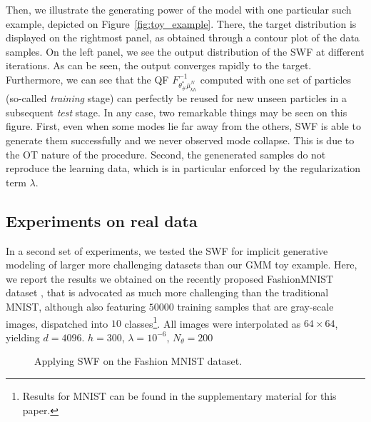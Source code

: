 Then, we illustrate the generating power of the model with one particular such example, depicted on Figure~\ref{fig:toy_example}. There, the target distribution is displayed on the rightmost panel, as obtained through a contour plot of the data samples. On the left panel, we see the output distribution of the SWF at different iterations. As can be seen, the output converges rapidly to the target. Furthermore, we can see that the QF $F^{-1}_{\theta^*_\#\bar{\mu}_{kh}^{N}}$ computed with one set of particles (so-called \textit{training} stage) can perfectly be reused for new unseen particles in a subsequent \textit{test} stage. In any case, two remarkable things may be seen on this figure. First, even when some modes lie far away from the others, SWF is able to generate them successfully and we never observed mode collapse. This is due to the OT nature of the procedure. Second, the genenerated samples do not reproduce the learning data, which is in particular enforced by the regularization term $\lambda$.




\subsection{Experiments on real data}
\label{sub:real_data}

In a second set of experiments, we tested the SWF for implicit generative modeling of larger more challenging datasets than our GMM toy example. Here, we report the results we obtained on the recently proposed FashionMNIST dataset \cite{xiao2017fashion}, that is advocated as much more challenging than the traditional MNIST, although also featuring $50000$ training samples that are gray-scale images, dispatched into $10$ classes\footnote{Results for MNIST can be found in the supplementary material for this paper.}. All images were interpolated as $64\times 64$, yielding $d=4096$. $h=300$, $\lambda=10^{-6}$, $N_\theta=200$



\begin{figure}
\centering
{}\hfill
{}
\caption{Applying SWF on the Fashion MNIST dataset.}
\end{figure}

